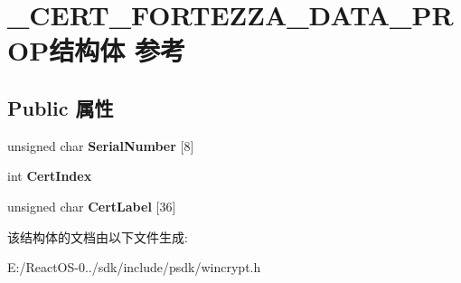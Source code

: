 \hypertarget{struct___c_e_r_t___f_o_r_t_e_z_z_a___d_a_t_a___p_r_o_p}{}\section{\+\_\+\+C\+E\+R\+T\+\_\+\+F\+O\+R\+T\+E\+Z\+Z\+A\+\_\+\+D\+A\+T\+A\+\_\+\+P\+R\+O\+P结构体 参考}
\label{struct___c_e_r_t___f_o_r_t_e_z_z_a___d_a_t_a___p_r_o_p}
\subsection*{Public 属性}
\begin{DoxyCompactItemize}
\item 
\mbox{\label{struct___c_e_r_t___f_o_r_t_e_z_z_a___d_a_t_a___p_r_o_p_a47ad0667c6906f0ea2f1b696494403ea}} 
unsigned char {\bfseries Serial\+Number} \mbox{[}8\mbox{]}
\item 
\mbox{\label{struct___c_e_r_t___f_o_r_t_e_z_z_a___d_a_t_a___p_r_o_p_acd7c423e481584b20dd551d751bd51fc}} 
int {\bfseries Cert\+Index}
\item 
\mbox{\label{struct___c_e_r_t___f_o_r_t_e_z_z_a___d_a_t_a___p_r_o_p_ac7d104694e4d312d4562530f243ea121}} 
unsigned char {\bfseries Cert\+Label} \mbox{[}36\mbox{]}
\end{DoxyCompactItemize}


该结构体的文档由以下文件生成\+:\begin{DoxyCompactItemize}
\item 
E\+:/\+React\+O\+S-\/0../sdk/include/psdk/wincrypt.\+h\end{DoxyCompactItemize}
